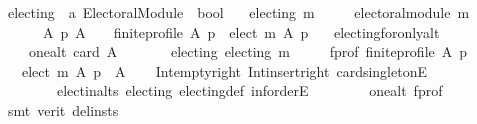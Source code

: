 \begin{isabellebody}
\ electing\ {\isacharcolon}{\kern0pt}{\isacharcolon}{\kern0pt}\ {\isachardoublequoteopen}{\isacharprime}{\kern0pt}a\ Electoral{\isacharunderscore}{\kern0pt}Module\ {\isasymRightarrow}\ bool{\isachardoublequoteclose}\ \isanewline
\ \ {\isachardoublequoteopen}electing\ m\ {\isasymequiv}\isanewline
\ \ \ \ electoral{\isacharunderscore}{\kern0pt}module\ m\ {\isasymand}\isanewline
\ \ \ \ \ \ {\isacharparenleft}{\kern0pt}{\isasymforall}A\ p{\isachardot}{\kern0pt}\ {\isacharparenleft}{\kern0pt}A\ {\isasymnoteq}\ {\isacharbraceleft}{\kern0pt}{\isacharbraceright}{\kern0pt}\ {\isasymand}\ finite{\isacharunderscore}{\kern0pt}profile\ A\ p{\isacharparenright}{\kern0pt}\ {\isasymlongrightarrow}\ elect\ m\ A\ p\ {\isasymnoteq}\ {\isacharbraceleft}{\kern0pt}{\isacharbraceright}{\kern0pt}{\isacharparenright}{\kern0pt}{\isachardoublequoteclose}\isanewline
\isanewline
{}\isamarkupfalse%
\ electing{\isacharunderscore}{\kern0pt}for{\isacharunderscore}{\kern0pt}only{\isacharunderscore}{\kern0pt}alt{\isacharcolon}{\kern0pt}\isanewline
\ \ \isanewline
\ \ \ \ one{\isacharunderscore}{\kern0pt}alt{\isacharcolon}{\kern0pt}\ {\isachardoublequoteopen}card\ A\ {\isacharequal}{\kern0pt}\ {}{\isachardoublequoteclose}\ \isanewline
\ \ \ \ electing{\isacharcolon}{\kern0pt}\ {\isachardoublequoteopen}electing\ m{\isachardoublequoteclose}\ \isanewline
\ \ \ \ f{\isacharunderscore}{\kern0pt}prof{\isacharcolon}{\kern0pt}\ {\isachardoublequoteopen}finite{\isacharunderscore}{\kern0pt}profile\ A\ p{\isachardoublequoteclose}\isanewline
\ \ \ {\isachardoublequoteopen}elect\ m\ A\ p\ {\isacharequal}{\kern0pt}\ A{\isachardoublequoteclose}\isanewline
%
\isadelimproof
\ \ %
\endisadelimproof
%
\isatagproof
{}\isamarkupfalse%
\ Int{\isacharunderscore}{\kern0pt}empty{\isacharunderscore}{\kern0pt}right\ Int{\isacharunderscore}{\kern0pt}insert{\isacharunderscore}{\kern0pt}right\ card{\isacharunderscore}{\kern0pt}{}{\isacharunderscore}{\kern0pt}singletonE\isanewline
\ \ \ \ \ \ \ \ elect{\isacharunderscore}{\kern0pt}in{\isacharunderscore}{\kern0pt}alts\ electing\ electing{\isacharunderscore}{\kern0pt}def\ inf{\isachardot}{\kern0pt}orderE\isanewline
\ \ \ \ \ \ \ \ one{\isacharunderscore}{\kern0pt}alt\ f{\isacharunderscore}{\kern0pt}prof\isanewline
\ \ \isamarkupfalse%
\ {\isacharparenleft}{\kern0pt}smt\ {\isacharparenleft}{\kern0pt}verit{\isacharcomma}{\kern0pt}\ del{\isacharunderscore}{\kern0pt}insts{\isacharparenright}{\kern0pt}{\isacharparenright}{\kern0pt}%

\end{isabellebody}

